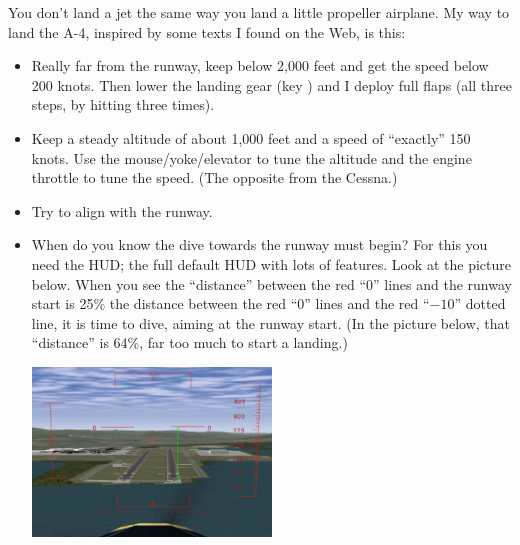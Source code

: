 You don't land a jet the same way you land a little propeller airplane.
My way to land the A-4, inspired by some texts I found on the Web, is
this:
\begin{itemize}
    \item Really far from the runway, keep below 2,000 feet and get the speed below 200 knots. Then lower the landing gear (key ) and I deploy full flaps (all three steps, by hitting \key{]} three times).
    \item Keep a steady altitude of about 1,000 feet and a speed of ``exactly'' 150 knots. Use the mouse/yoke/elevator to tune the altitude and the engine throttle to tune the speed. (The opposite from the Cessna.)
    \item Try to align with the runway.
    \item When do you know the dive towards the runway must begin? For this you need the  HUD; the full default HUD with lots of features. Look at the picture below. When you see the ``distance'' between the red ``0'' lines and the runway start is 25\% the distance between the red ``0'' lines and the red ``$-10$'' dotted line, it is time to dive, aiming at the runway start. (In the picture below, that ``distance'' is 64\%, far too much to start a landing.)


\begin{center}
\includegraphics[width=0.5\textwidth]{img/tut_54}
\end{center}


\end{itemize}
